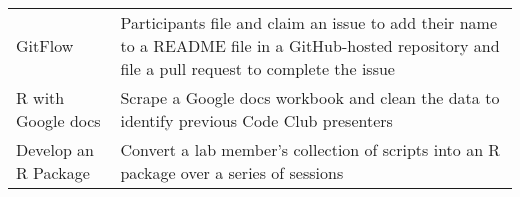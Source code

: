 \documentclass[
  11pt,
]{article}
\begin{document}
\begin{longtable}[]{@{}ll@{}}
\begin{minipage}[t]{0.25\columnwidth}\raggedright
GitFlow\strut
\end{minipage} & \begin{minipage}[t]{0.69\columnwidth}\raggedright
Participants file and claim an issue to add their name to a README file
in a GitHub-hosted repository and file a pull request to complete the
issue\strut
\end{minipage}\tabularnewline
\begin{minipage}[t]{0.25\columnwidth}\raggedright
R with Google docs\strut
\end{minipage} & \begin{minipage}[t]{0.69\columnwidth}\raggedright
Scrape a Google docs workbook and clean the data to identify previous
Code Club presenters\strut
\end{minipage}\tabularnewline
\begin{minipage}[t]{0.25\columnwidth}\raggedright
Develop an R Package\strut
\end{minipage} & \begin{minipage}[t]{0.69\columnwidth}\raggedright
Convert a lab member's collection of scripts into an R package over a
series of sessions\strut
\end{minipage}\tabularnewline
\bottomrule
\end{longtable}
\end{document}
